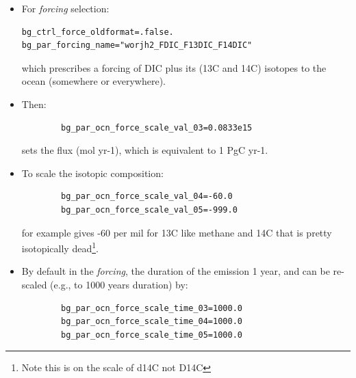 \documentclass[11pt,fleqn]{book} %
\begin{document}
\begin{itemize}[noitemsep]
\setlength{\itemindent}{.2in}

\vspace{1mm}
\item For \textit{forcing} selection:
\\\vspace{-2mm}\small\begin{verbatim}
bg_ctrl_force_oldformat=.false.
bg_par_forcing_name="worjh2_FDIC_F13DIC_F14DIC"
\end{verbatim}\normalsize\vspace{-2mm}
which prescribes a forcing of DIC plus its (13C and 14C) isotopes to the ocean (somewhere or everywhere).

\vspace{1mm}
\item Then:
\\\vspace{-6mm}\small\begin{verbatim}
        bg_par_ocn_force_scale_val_03=0.0833e15
\end{verbatim}\normalsize\vspace{-2mm}
sets the flux (mol yr-1), which is equivalent to 1 PgC yr-1.
        
\vspace{1mm}
\item To scale the isotopic composition:
\\\vspace{-4mm}\small\begin{verbatim}
        bg_par_ocn_force_scale_val_04=-60.0
        bg_par_ocn_force_scale_val_05=-999.0
\end{verbatim}\normalsize\vspace{-2mm}
for example gives -60 per mil for 13C like methane and 14C that is pretty isotopically dead\footnote{Note this is on the scale of d14C not D14C}.

\vspace{1mm}
        \item By default in the \textit{forcing}, the duration of the emission 1 year, and can be re-scaled (e.g., to 1000 years duration) by: 
\\\vspace{-2mm}\small\begin{verbatim}
        bg_par_ocn_force_scale_time_03=1000.0
        bg_par_ocn_force_scale_time_04=1000.0
        bg_par_ocn_force_scale_time_05=1000.0
\end{verbatim}\normalsize\vspace{-2mm}
        

\end{itemize}
\end{document}
